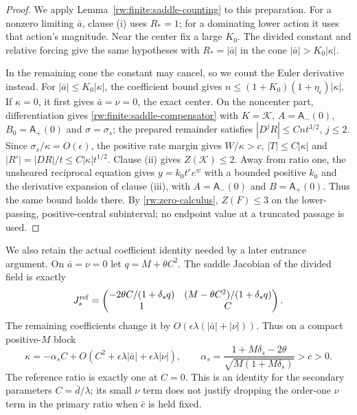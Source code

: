 \begin{proof}
We apply Lemma~\ref{rw:finite:saddle-counting} to this preparation.
For a nonzero limiting $\bar a$, clause \textup{(i)} uses $R_*=1$;
for a dominating lower action it uses that action's magnitude.
Near the center fix a large $K_0$. The divided constant and relative
forcing give the same hypotheses with $R_*=|\bar a|$ in the cone
$|\bar a|>K_0|\kappa|$.

In the remaining cone the constant may cancel, so we count the Euler
derivative instead. For $|\bar a|\le K_0|\kappa|$, the coefficient
bound gives $n\le(1+K_0)(1+\eta_\epsilon)|\kappa|$.
If $\kappa=0$, it first gives $\bar a=\nu=0$, the exact center.
On the noncenter part, differentiation gives
\eqref{rw:finite:saddle-compensator} with $K=\mathcal K$,
$A=\mathsf A_-(0)$, $B_0=\mathsf A_+(0)$ and $\sigma=\sigma_s$;
the prepared remainder satisfies $|D^jR|\le Cnt^{3/2}$, $j\le2$.
Since $\sigma_s/\kappa=O(\epsilon)$, the positive rate margin gives
$W/\kappa>c$, $|T|\le C|\kappa|$ and
$|R'|=|DR|/t\le C|\kappa|t^{1/2}$.
Clause \textup{(ii)} gives $Z(\mathcal K)\le2$.
Away from ratio one, the unsheared reciprocal equation gives
$y=k_0t^re^w$ with a bounded positive $k_0$ and the derivative
expansion of clause \textup{(iii)}, with
$A=\mathsf A_-(0)$ and $B=\mathsf A_+(0)$.
Thus the same bound holds there. By \ref{rw:zero-calculus},
$Z(F)\le3$ on the lower-passing, positive-central subinterval;
no endpoint value at a truncated passage is used.
\end{proof}

We also retain the actual coefficient identity needed by a later
entrance argument. On $\bar a=\nu=0$ let $q=M+\theta C^2$.
The saddle Jacobian of the divided field is exactly
\[
 J_s^{\rm ref}=
 \begin{pmatrix}
 -2\theta C/(1+\delta_s q)&(M-\theta C^2)/(1+\delta_s q)\\
 1&C
 \end{pmatrix}.
\]
The remaining coefficients change it by
$O(\epsilon\lambda(|\bar a|+|\nu|))$.
Thus on a compact positive-$M$ block
\begin{equation}\label{rw:secondary:saddle-ratio}
 \kappa=-\alpha_s C+
 O(C^2+\epsilon\lambda|\bar a|+\epsilon\lambda|\nu|),\qquad
 \alpha_s=\frac{1+M\delta_s-2\theta}
                  {\sqrt{M(1+M\delta_s)}}>c>0 .
\end{equation}
The reference ratio is exactly one at $C=0$. This is an identity
for the secondary parameters $C=\bar d/\lambda$; its small
$\nu$ term does not justify dropping the order-one $\nu$ term in
the primary ratio when $\bar c$ is held fixed.


